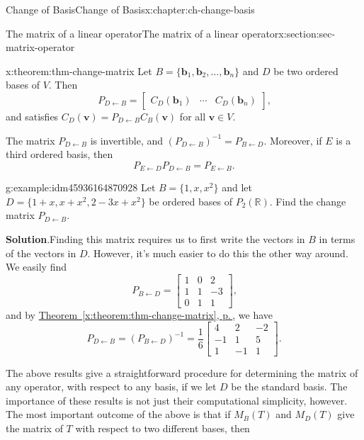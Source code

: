 \documentclass[oneside,10pt,]{book}
\newcommand{\blocktitlefont}{\relax}
\newcommand{\xreffont}{\relax}
\numberwithin{equation}{section}
\newcommand{\bbm}{\begin{bmatrix}}
\newcommand{\ebm}{\end{bmatrix}}
\newcommand{\R}{\mathbb{R}}
\newcommand{\vv}{\mathbf{v}}
\newcommand{\basis}[2]{\{\mathbf{#1}_1,\mathbf{#1}_2,\ldots,\mathbf{#1}_{#2}\}}
\newcommand{\amp}{&}
\begin{document}
\begin{chapterptx}{Change of Basis}{}{Change of Basis}{}{}{x:chapter:ch-change-basis}
\begin{sectionptx}{The matrix of a linear operator}{}{The matrix of a linear operator}{}{}{x:section:sec-matrix-operator}
\begin{theorem}{}{}{x:theorem:thm-change-matrix}%
Let \(B=\basis{b}{n}\) and \(D\) be two ordered bases of \(V\). Then%
\begin{equation*}
P_{D\leftarrow B} = \bbm C_D(\mathbf{b}_1)\amp \cdots \amp C_D(\mathbf{b}_n)\ebm\text{,}
\end{equation*}
and satisfies \(C_D(\vv) = P_{D\leftarrow B}C_B(\vv)\) for all \(\vv\in V\).%
\par
The matrix \(P_{D\leftarrow B}\) is invertible, and \((P_{D\leftarrow B})^{-1} = P_{B\leftarrow D}\). Moreover, if \(E\) is a third ordered basis, then%
\begin{equation*}
P_{E\leftarrow D}P_{D\leftarrow B} = P_{E\leftarrow B}\text{.}
\end{equation*}
%
\end{theorem}
\begin{example}{}{g:example:idm45936164870928}%
Let \(B = \{1,x,x^2\}\) and let \(D = \{1+x,x+x^2,2-3x+x^2\}\) be ordered bases of \(P_2(\R)\). Find the change matrix \(P_{D\leftarrow B}\).%
\par\smallskip%
\noindent\textbf{\blocktitlefont Solution}.\label{g:solution:idm45936164868544}{}\hypertarget{g:solution:idm45936164868544}{}\quad{}Finding this matrix requires us to first write the vectors in \(B\) in terms of the vectors in \(D\). However, it's much easier to do this the other way around. We easily find%
\begin{equation*}
P_{B\leftarrow D} = \bbm 1\amp 0\amp 2\\1\amp 1\amp -3\\0\amp 1\amp 1\ebm\text{,}
\end{equation*}
and by \hyperref[x:theorem:thm-change-matrix]{Theorem~{\xreffont\ref{x:theorem:thm-change-matrix}}, p.\,\pageref{x:theorem:thm-change-matrix}}, we have%
\begin{equation*}
P_{D\leftarrow B} = (P_{B\leftarrow D})^{-1} = \frac16\bbm 4\amp 2\amp -2\\-1\amp 1\amp 5\\1\amp -1\amp 1\ebm\text{.}
\end{equation*}
%
\end{example}
The above results give a straightforward procedure for determining the matrix of any operator, with respect to any basis, if we let \(D\) be the standard basis. The importance of these results is not just their computational simplicity, however. The most important outcome of the above is that if \(M_B(T)\) and \(M_D(T)\) give the matrix of \(T\) with respect to two different bases, then%

\end{sectionptx}
\end{chapterptx}
\end{document}
